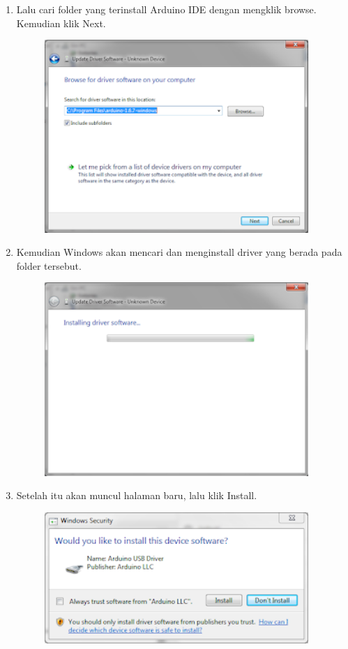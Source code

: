 \begin{enumerate}
\begin{figure}[H]
		\centering
	\end{figure}
	\item Lalu cari folder yang terinstall Arduino IDE dengan mengklik browse. Kemudian klik Next.
	\begin{figure}[H]
		\includegraphics[width=10cm]{figures/5/1174021/Teori/7.png}
		\centering
	\end{figure}
	\item Kemudian Windows akan mencari dan menginstall driver yang berada pada folder tersebut.
	\begin{figure}[H]
		\includegraphics[width=10cm]{figures/5/1174021/Teori/8.png}
		\centering
	\end{figure}
	\item Setelah itu akan muncul halaman baru, lalu klik Install.
	\begin{figure}[H]
		\includegraphics[width=10cm]{figures/5/1174021/Teori/9.png}

\end{figure}
\end{enumerate}
